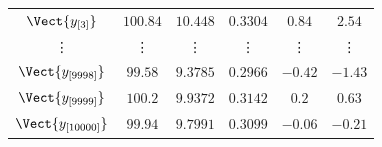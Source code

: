 \documentclass[10pt]{report}
\begin{document}
\begin{exercice}
\begin{enumerate}
\begin{center}
\begin{tabular}{c|ccccc}
    
        $\Vect{y_{[3]}}$
         & 
    
        $100.84$
         & 
    
        $10.448$
         & 
    
        $0.3304$
         & 
    
        $0.84$
         & 
    
        $2.54$
        
    \\ 

    
        \vdots
         & 
    
        \vdots
         & 
    
        \vdots
         & 
    
        \vdots
         & 
    
        \vdots
         & 
    
        \vdots
        
    \\ 

    
        $\Vect{y_{[9998]}}$
         & 
    
        $99.58$
         & 
    
        $9.3785$
         & 
    
        $0.2966$
         & 
    
        $-0.42$
         & 
    
        $-1.43$
        
    \\ 

    
        $\Vect{y_{[9999]}}$
         & 
    
        $100.2$
         & 
    
        $9.9372$
         & 
    
        $0.3142$
         & 
    
        $0.2$
         & 
    
        $0.63$
        
    \\ 

    
        $\Vect{y_{[10000]}}$
         & 
    
        $99.94$
         & 
    
        $9.7991$
         & 
    
        $0.3099$
         & 
    
        $-0.06$
         & 
    
        $-0.21$
        
    \\ \cline{1-6}


\end{tabular}
\end{center}
\end{enumerate}
\end{exercice}
\end{document}
